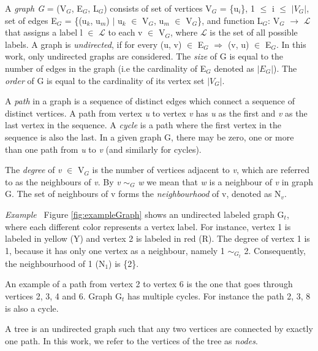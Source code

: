 \documentclass{l4proj}
\newcounter{example}[section]
\newenvironment{example}[1][]{\refstepcounter{example}\par\medskip
   \noindent \textit{Example~\theexample #1} \rmfamily}{\medskip}
\newcommand{\Lagr}{\mathcal{L}}
\begin{document}
A \emph{graph G} = (V$_{G}$, E$_{G}$, L$_{G}$) consists of set of vertices V$_{G}$ = \{u$_i$\}, 1 $\leq$ i $\leq$ $|V_{G}|$, set of edges E$_{G}$ = \{(u$_k$, u$_m$) $|$ u$_k$ $\in$ V$_{G}$, u$_m$ $\in$ V$_{G}$\}, and  function  L$_{G}$: V$_{G}$ $\rightarrow$ $\Lagr$ that assigns a label l $\in$ $\Lagr$ to each v $\in$ V$_{G}$, where $\Lagr$ is the set of all possible labels. A graph is \emph{undirected}, if for every (u, v) $\in$ E$_{G}$ $\Rightarrow$ (v, u) $\in$ E$_{G}$. In this work, only undirected graphs are considered. The \emph{size} of G is equal to the number of edges in the graph (i.e the cardinality of E$_{G}$ denoted as $|E_{G}|$). The \emph{order} of G is equal to the cardinality of its vertex set $|V_{G}|$.

A \emph{path} in a graph is a sequence of distinct edges which connect a sequence of distinct vertices. A path from vertex \emph{u} to vertex \emph{v} has \emph{u} as the first and \emph{v} as the last vertex in the sequence. A \emph{cycle} is a path where the first vertex in the sequence is also the last. In a given graph G, there may be zero, one or more than one path from \emph{u} to \emph{v} (and similarly for cycles).

The \emph{degree} of \emph{v} $\in$ V$_{G}$ is the number of vertices adjacent to \emph{v}, which are referred to as the neighbours of \emph{v}. By \emph{v} $\sim_{G}$ \textit{w} we mean that \textit{w} is a neighbour of \emph{v} in graph G. The set of neighbours of v forms the \emph{neighbourhood} of v, denoted as N$_{v}$. 

\begin{example}
Figure \ref{fig:exampleGraph} shows an undirected labeled graph G$_{t}$, where each different color represents a vertex label. For instance, vertex 1 is labeled in yellow (Y) and vertex 2 is labeled in red (R). The degree of vertex 1 is 1, because it has only one vertex as a neighbour, namely 1 $\sim_{G_{t}}$ 2. Consequently, the neighbourhood of 1 (N$_{1}$) is \{2\}.

An example of a path from vertex 2 to vertex 6 is the one that goes through vertices 2, 3, 4 and 6. Graph G$_{t}$ has multiple cycles. For instance the path 2, 3, 8 is also a cycle.
\end{example}

A tree is an undirected graph such that any two vertices are connected by exactly one path. In this work, we refer to the vertices of the tree as \emph{nodes}.
\end{document}
